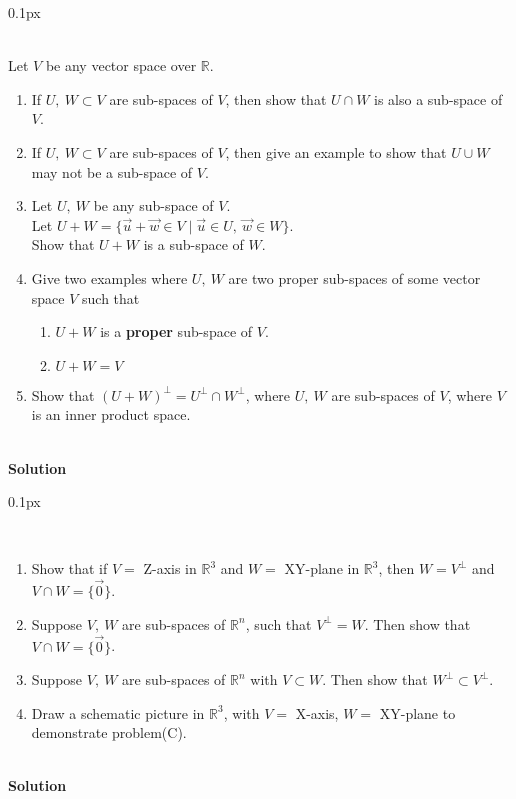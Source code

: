 \documentclass[11pt]{article}
\newcommand{\problem}[1]{\begin{adjustwidth}{0.1px}\noindent \framebox[1.2\width]{\large Problem #1}\end{adjustwidth} \bigskip\\}
\begin{document}
\newpage
\problem{3}
Let $V$ be any vector space over $\mathbb{R}$.
\begin{enumerate}[label=(\Alph*)]
    \item If $U, \ W \subset V$ are sub-spaces of $V$, then show that $U \cap W$ is also a sub-space of $V$.
    \item If $U, \ W \subset V$ are sub-spaces of $V$, then give an example to show that $U \cup W$ may not be a sub-space of $V$.
    \item Let $U, \ W$ be any sub-space of $V$.\\
    Let $U+W = \{ \vec{u} + \vec{w} \in V \mid \vec{u} \in U, \ \vec{w} \in W \}$.\\
    Show that $U+W$ is a sub-space of $W$.
    \item Give two examples where $U, \ W$ are two proper sub-spaces of some vector space $V$ such that 
    \begin{enumerate}[label=(\alph*)]
        \item $U+W$ is a \textbf{proper }sub-space of $V$.
        \item $U+W=V$
    \end{enumerate}
    \item Show that $(U+W)^\perp = U^\perp \cap W^\perp$, where $U, \ W$ are sub-spaces of $V$, where $V$ is an inner product space.
\end{enumerate}
\bigskip\\
\textbf{Solution}








\newpage
\problem{4}
\begin{enumerate}[label=(\Alph*)]
    \item Show that if $V = $ Z-axis in $\mathbb{R}^3$ and $W = $ XY-plane in $\mathbb{R}^3$, then $W = V^{\perp}$ and $V \cap W = \{ \vec{0}\}$.
    \item Suppose $V, \ W$ are sub-spaces of $\mathbb{R}^n$, such that $V^{\perp} = W$. Then show that $V \cap W = \{ \vec{0}\}$.
    \item Suppose $V, \ W$ are sub-spaces of $\mathbb{R}^n$ with $V \subset W$. Then show that $W^\perp \subset V^\perp$.
    \item Draw a schematic picture in $\mathbb{R}^3$, with $V = $ X-axis, $W = $ XY-plane to demonstrate problem(C).
\end{enumerate}
\bigskip\\
\textbf{Solution}
\end{document}
